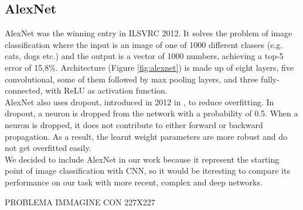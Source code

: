 \documentclass{article}
\begin{document}
\subsection{AlexNet}
AlexNet was the winning entry in ILSVRC 2012. It solves the problem of image classification where the input is an image of one of 1000 different classes (e.g. cats, dogs etc.) and the output is a vector of 1000 numbers, achieving a top-5 error of 15,8\%.
Architecture (Figure \ref{fig:alexnet}) is made up of eight layers, five convolutional, some of them followed by max pooling layers, and three fully-connected, with ReLU as activation function.\\
AlexNet also uses dropout, introduced in 2012 in \cite{dropout}, to reduce overfitting. In dropout, a neuron is dropped from the network with a probability of 0.5. When a neuron is dropped, it does not contribute to either forward or backward propagation. 
As a result, the learnt weight parameters are more robust and do not get overfitted easily.\\
We decided to include AlexNet in our work because it represent the starting point of image classification with CNN, so it would be iteresting to compare its performance on our task with more recent, complex and deep networks.


PROBLEMA IMMAGINE CON 227X227
\end{document}
